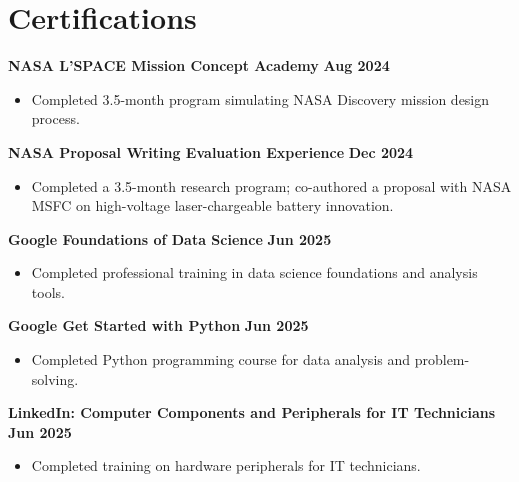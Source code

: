 \documentclass[letterpaper,11pt]{article}
\begin{document}
\section*{Certifications}
\textbf{NASA L'SPACE Mission Concept Academy} \hfill \textbf{Aug 2024}
\begin{itemize}
    \item Completed 3.5-month program simulating NASA Discovery mission design process.
\end{itemize}
\vspace{4mm}
\textbf{NASA Proposal Writing Evaluation Experience} \hfill \textbf{Dec 2024}
\begin{itemize}
    \item Completed a 3.5-month research program; co-authored a proposal with NASA MSFC on high-voltage laser-chargeable battery innovation.
\end{itemize}
\vspace{4mm}
\textbf{Google Foundations of Data Science} \hfill \textbf{Jun 2025}
\begin{itemize}
    \item Completed professional training in data science foundations and analysis tools.
\end{itemize}
\vspace{4mm}
\textbf{Google Get Started with Python} \hfill \textbf{Jun 2025}
\begin{itemize}
    \item Completed Python programming course for data analysis and problem-solving.
\end{itemize}
\vspace{4mm}
\textbf{LinkedIn: Computer Components and Peripherals for IT Technicians} \hfill \textbf{Jun 2025}
\begin{itemize}
    \item Completed training on hardware peripherals for IT technicians.
\end{itemize}
\vspace{4mm}
\end{document}
